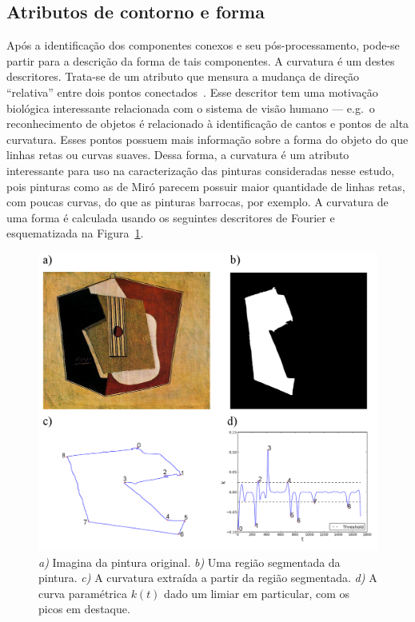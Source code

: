 \subsection{Atributos de contorno e forma}

Após a identificação dos componentes conexos e seu pós-processamento,
pode-se partir para a descrição da forma de tais componentes. A
curvatura é um destes descritores. Trata-se de um atributo que mensura
a mudança de direção ``relativa'' entre dois pontos
conectados~\cite{luciano}. Esse descritor tem uma motivação biológica
interessante relacionada com o sistema de visão humano --- e.g.\ o
reconhecimento de objetos é relacionado à identificação de cantos e
pontos de alta curvatura. Esses pontos possuem mais informação sobre a
forma do objeto do que linhas retas ou curvas suaves. Dessa forma, a
curvatura é um atributo interessante para uso na caracterização das
pinturas consideradas nesse estudo, pois pinturas como as de Miró
parecem possuir maior quantidade de linhas retas, com poucas curvas,
do que as pinturas barrocas, por exemplo. A curvatura de uma forma é
calculada usando os seguintes descritores de Fourier e esquematizada
na Figura~\ref{fig:curvatura}.

\begin{figure}[h!]
\begin{center}
        \includegraphics[width=\columnwidth]{figs/curvatura}
      \caption{\textit{a)} Imagina da pintura original. \textit{b)} Uma região
        segmentada da pintura. \textit{c)} A curvatura extraída a partir
        da região segmentada. \textit{d)} A curva paramétrica $k(t)$ dado um
        limiar em particular, com os picos em destaque.}
        \label{fig:curvatura}
\end{center}
\end{figure}

